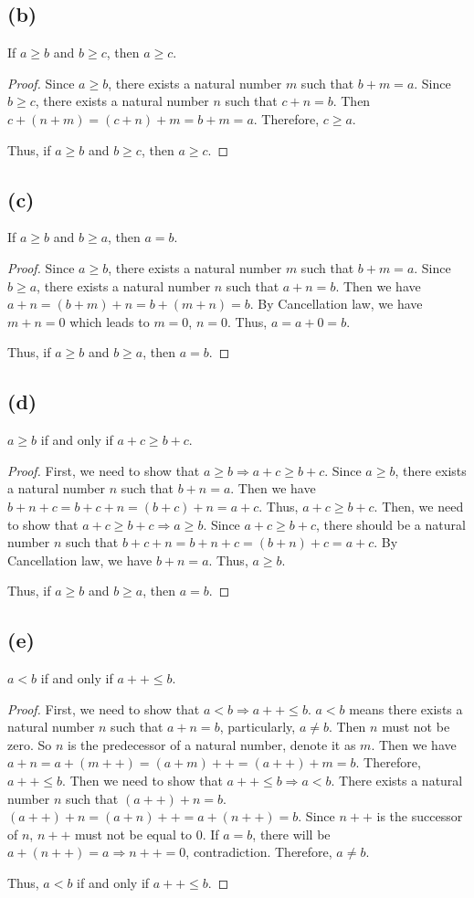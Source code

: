 \documentclass[12pt, letter]{article}
\begin{document}
\subsection*{(b)}
If $a\geq b$ and $b\geq c$, then $a\geq c$.
\begin{proof}
    Since $a\geq b$, there exists a natural number $m$ such that $b+m=a$. Since $b\geq c$, there exists a natural 
    number $n$ such that $c+n=b$. Then $c+(n+m)=(c+n)+m=b+m=a$. Therefore, $c\geq a$.

    Thus, if $a\geq b$ and $b\geq c$, then $a\geq c$.
\end{proof}
\subsection*{(c)}
If $a\geq b$ and $b\geq a$, then $a=b$.
\begin{proof}
    Since $a\geq b$, there exists a natural number $m$ such that $b+m=a$. Since $b\geq a$, there exists a natural number $n$ such that $a+n=b$. Then we have $a+n=(b+m)+n=b+(m+n)=b$. 
    By Cancellation law, we have $m+n=0$ which leads to $m=0$, $n=0$. Thus, $a=a+0=b$. 

    Thus, if $a\geq b$ and $b\geq a$, then $a=b$.
\end{proof}
\subsection*{(d)}
$a\geq b$ if and only if $a+c\geq b+c$.
\begin{proof}
    First, we need to show that $a\geq b \Rightarrow a+c\geq b+c$. Since $a\geq b$, there exists a natural number $n$ such that 
    $b+n=a$. Then we have $b+n+c=b+c+n=(b+c)+n=a+c$. Thus, $a+c\geq b+c$. Then, we need to show that $a+c\geq b+c\Rightarrow a\geq b$. Since $a+c\geq b+c$, there should be a natural number $n$ such 
    that $b+c+n=b+n+c=(b+n)+c=a+c$. By Cancellation law, we have $b+n=a$. Thus, $a\geq b$. 

    Thus, if $a\geq b$ and $b\geq a$, then $a=b$.
\end{proof}
\subsection*{(e)}
$a<b$ if and only if $a++\leq b$.
\begin{proof}
    First, we need to show that $a<b\Rightarrow a++\leq b$. $a<b$ means there exists a natural number $n$ such that 
    $a+n=b$, particularly, $a\ne b$. Then $n$ must not be zero. So $n$ is the predecessor of a natural number, denote it as $m$. Then we have $a+n=a+(m++)=(a+m)++=(a++)+m=b$. Therefore, $a++\leq b$. Then 
    we need to show that $a++\leq b\Rightarrow a<b$. There exists a natural number $n$ such that $(a++)+n=b$. $(a++)+n=(a+n)++=a+(n++)=b$. Since $n++$ is the successor of $n$, $n++$ must not be equal to $0$.
    If $a=b$, there will be $a+(n++)=a\Rightarrow n++=0$, contradiction. Therefore, $a\ne b$. 
    
    Thus, $a<b$ if and only if $a++\leq b$.
\end{proof}
\end{document}
